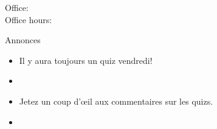\documentclass{beamer}
\subtitle[Adjectifs prénominaux au singulier]{Les adjectifs prénominaux au singulier}
\begin{document}
  \begin{frame}
    \titlepage
    \tiny{Office: \\
          Office hours: }
  \end{frame}

  \begin{frame}{Annonces}
    \begin{itemize}
      \item Il y aura toujours un quiz vendredi!
      \item[] 
      \item Jetez un coup d'œil aux commentaires sur les quizs.
      \item[] 
    \end{itemize}
  \end{frame}

\end{document}
